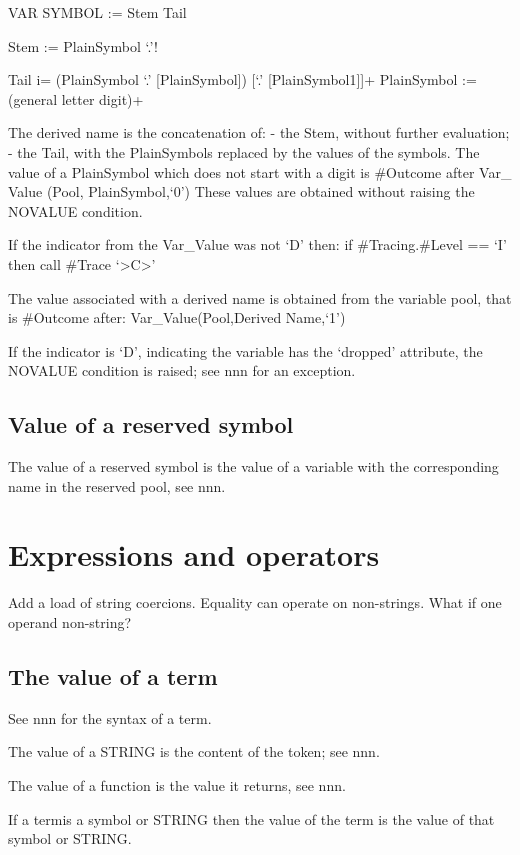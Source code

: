 VAR SYMBOL := Stem Tail

Stem := PlainSymbol `.'!

Tail i= (PlainSymbol \textbar{} `.' {[}PlainSymbol{]}) {[}`.'
{[}PlainSymbol1{]}{]}+ PlainSymbol := (general letter \textbar{} digit)+

The derived name is the concatenation of: - the Stem, without further
evaluation; - the Tail, with the PlainSymbols replaced by the values of
the symbols. The value of a PlainSymbol which does not start with a
digit is \#Outcome after Var\_ Value (Pool, PlainSymbol,`0') These
values are obtained without raising the NOVALUE condition.

If the indicator from the Var\_Value was not `D' then: if
\#Tracing.\#Level == `I' then call \#Trace
`\textgreater C\textgreater{}'

The value associated with a derived name is obtained from the variable
pool, that is \#Outcome after: Var\_Value(Pool,Derived Name,`1')

If the indicator is `D', indicating the variable has the `dropped'
attribute, the NOVALUE condition is raised; see nnn for an exception.

\subsection{Value of a reserved
symbol}\label{value-of-a-reserved-symbol}

The value of a reserved symbol is the value of a variable with the
corresponding name in the reserved pool, see nnn.

\section{Expressions and operators}\label{expressions-and-operators}

Add a load of string coercions. Equality can operate on non-strings.
What if one operand non-string?

\subsection{The value of a term}\label{the-value-of-a-term}

See nnn for the syntax of a term.

The value of a STRING is the content of the token; see nnn.

The value of a function is the value it returns, see nnn.

If a termis a symbol or STRING then the value of the term is the value
of that symbol or STRING.

